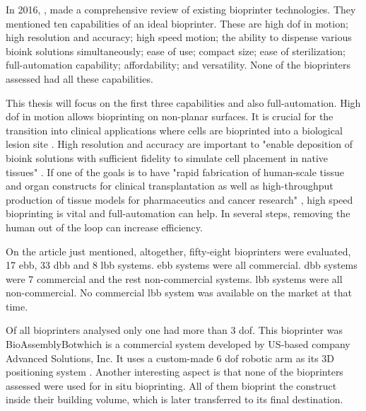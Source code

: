 In 2016, \citeauthor{Ozbolat2017_evaluation_bioprinter_tech} \cite{Ozbolat2017_evaluation_bioprinter_tech}, made a comprehensive review of existing bioprinter technologies. They mentioned ten capabilities of an ideal bioprinter. These are high \gls{dof} in motion; high resolution and accuracy; high speed motion; the ability to dispense various bioink solutions simultaneously; ease of use; compact size; ease of sterilization; full-automation capability; affordability; and versatility. None of the bioprinters assessed had all these capabilities.

This thesis will focus on the first three capabilities and also full-automation. High \gls{dof} in motion allows bioprinting on non-planar surfaces. It is crucial for the transition into clinical applications where cells are bioprinted into a biological lesion site \cite{Ozbolat2017_evaluation_bioprinter_tech}. High resolution and accuracy are important to "enable deposition of bioink solutions with sufficient fidelity to simulate cell placement in native tissues" \cite{Ozbolat2017_evaluation_bioprinter_tech}. If one of the goals is to have "rapid fabrication of human-scale tissue and organ constructs for clinical transplantation as well as high-throughput production of tissue models for pharmaceutics and cancer research" \cite{Ozbolat2017_evaluation_bioprinter_tech}, high speed bioprinting is vital and full-automation can help. In several steps, removing the human out of the loop can increase efficiency.

On the article just mentioned, altogether, fifty-eight bioprinters were evaluated, 17 \gls{ebb}, 33 \gls{dbb} and 8 \gls{lbb} systems. \gls{ebb} systems were all commercial. \gls{dbb} systems were 7 commercial and the rest non-commercial systems. \gls{lbb} systems were all non-commercial. No commercial \gls{lbb} system was available on the market at that time.

Of all bioprinters analysed only one had more than 3 \gls{dof}. This bioprinter was BioAssemblyBot\textregistered which is a commercial system developed by US-based company Advanced Solutions, Inc. It uses a custom-made 6 \gls{dof} robotic arm as its 3D positioning system \cite{Advanced2020_bioassemblybot}. Another interesting aspect is that none of the bioprinters assessed were used for in situ bioprinting. All of them bioprint the construct inside their building volume, which is later transferred to its final destination.

